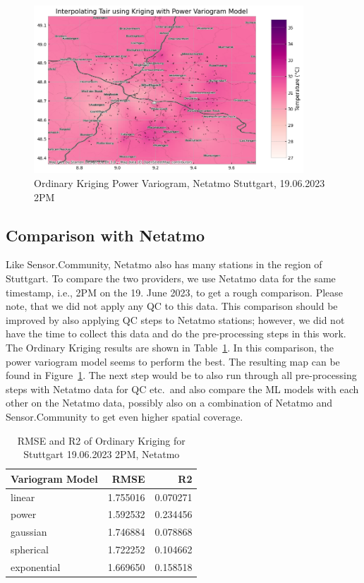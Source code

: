 \begin{figure}[ht]
    \centering
    \includegraphics[width=0.9\textwidth]{images/eval areal interpolation ok stuttgart 14h netatmo.png}
    \caption{Ordinary Kriging Power Variogram, Netatmo Stuttgart, 19.06.2023 2PM}
    \label{fig:eval areal interpolation ok 14h stuttgart netatmo}
\end{figure}

\subsection{Comparison with Netatmo}

Like Sensor.Community, Netatmo also has many stations in the region of Stuttgart. To compare the two providers, we use Netatmo data for the same timestamp, i.e., 2PM on the 19. June 2023, to get a rough comparison. Please note, that we did not apply any QC to this data. This comparison should be improved by also applying QC steps to Netatmo stations; however, we did not have the time to collect this data and do the pre-processing steps in this work. The Ordinary Kriging results are shown in Table~\ref{tab: areal interpolation ok 2pm netatmo stuttgart}. In this comparison, the power variogram model seems to perform the best. The resulting map can be found in Figure~\ref{fig:eval areal interpolation ok 14h stuttgart netatmo}. The next step would be to also run through all pre-processing steps with Netatmo data for QC etc.\ and also compare the ML models with each other on the Netatmo data, possibly also on a combination of Netatmo and Sensor.Community to get even higher spatial coverage.

\begin{table}[ht]
  \centering
  \begin{tabular}{lrr}
  \toprule
  Variogram Model &     RMSE &       R2 \\
  \midrule
          linear & 1.755016 & 0.070271 \\
            power & 1.592532 & 0.234456 \\
        gaussian & 1.746884 & 0.078868 \\
        spherical & 1.722252 & 0.104662 \\
      exponential & 1.669650 & 0.158518 \\
  \bottomrule
  \end{tabular}
  \label{tab: areal interpolation ok 2pm netatmo stuttgart}
  \caption{RMSE and R2 of Ordinary Kriging for Stuttgart 19.06.2023 2PM, Netatmo}
\end{table}

